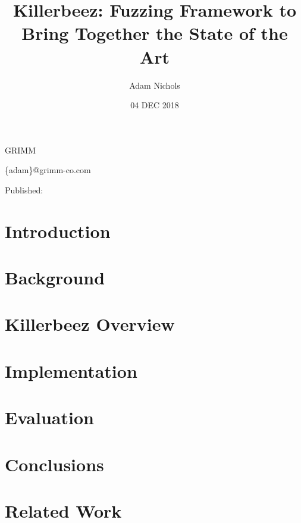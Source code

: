 \documentclass{article}
\title{Killerbeez: Fuzzing Framework to Bring Together the State of the Art}
\author{Adam Nichols}
\date{04 DEC 2018}
\begin{document}
\makeatletter
\centerline{\Large{\textbf{\@title}}}

\centerline{\@author}

\centerline{GRIMM}

\centerline{\{adam\}@grimm-co.com}

\centerline{Published: \@date}
\makeatother


\begin{multicols}{2}

\section{Introduction} \label{Introduction}


\section{Background} \label{Background}


\section{Killerbeez Overview} \label{Killerbeez Overview}


\section{Implementation} \label{Implementation}


\section{Evaluation} \label{Evaluation}

\section{Conclusions} \label{Conclusions}

\section{Related Work} \label{Related Work}


\end{multicols}
\end{document}
